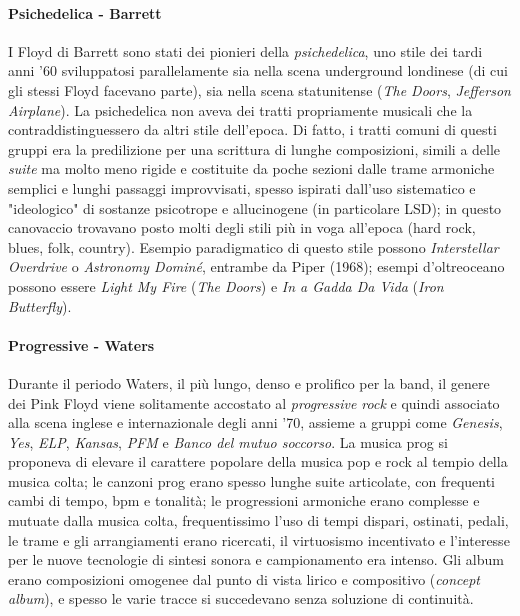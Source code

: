 \documentclass[class=book, crop=false, oneside, 12pt]{standalone}
\begin{document}
    \paragraph{Psichedelica - Barrett}
    I Floyd di Barrett sono stati dei pionieri della \emph{psichedelica}, uno stile dei tardi anni '60 sviluppatosi parallelamente sia nella scena underground londinese (di cui gli stessi Floyd facevano parte), sia nella scena statunitense (\emph{The Doors}, \emph{Jefferson Airplane}). La psichedelica non aveva dei tratti propriamente musicali che la contraddistinguessero da altri stile dell'epoca. Di fatto, i tratti comuni di questi gruppi era la predilizione per una scrittura di lunghe composizioni, simili a delle \emph{suite} ma molto meno rigide e costituite da poche sezioni dalle trame armoniche semplici e lunghi passaggi improvvisati, spesso ispirati dall'uso sistematico e "ideologico" di sostanze psicotrope e allucinogene (in particolare LSD); in questo canovaccio trovavano posto molti degli stili più in voga all'epoca (hard rock, blues, folk, country). Esempio paradigmatico di questo stile possono \emph{Interstellar Overdrive} o \emph{Astronomy Dominé}, entrambe da Piper (1968); esempi d'oltreoceano possono essere \emph{Light My Fire} (\emph{The Doors}) e \emph{In a Gadda Da Vida} (\emph{Iron Butterfly}).

    \paragraph{Progressive - Waters}
    Durante il periodo Waters, il più lungo, denso e prolifico per la band, il genere dei Pink Floyd viene solitamente accostato al \emph{progressive rock} e quindi associato alla scena inglese e internazionale degli anni '70, assieme a gruppi come \emph{Genesis}, \emph{Yes}, \emph{ELP}, \emph{Kansas}, \emph{PFM} e \emph{Banco del mutuo soccorso}. La musica prog si proponeva di elevare il carattere popolare della musica pop e rock al tempio della musica colta; le canzoni prog erano spesso lunghe suite articolate, con frequenti cambi di tempo, bpm e tonalità; le progressioni armoniche erano complesse e mutuate dalla musica colta, frequentissimo l'uso di tempi dispari, ostinati, pedali, le trame e gli arrangiamenti erano ricercati, il virtuosismo incentivato e l'interesse per le nuove tecnologie di sintesi sonora e campionamento era intenso. Gli album erano composizioni omogenee dal punto di vista lirico e compositivo (\emph{concept album}), e spesso le varie tracce si succedevano senza soluzione di continuità.
\end{document}
